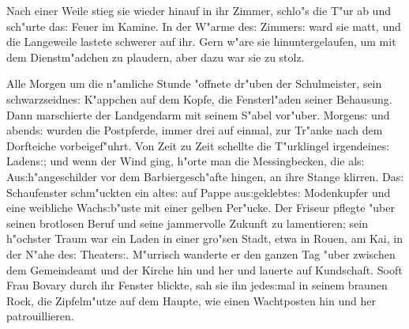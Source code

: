 \documentclass[oneside,12pt]{book}
\newcommand{\s}{s:}%
\begin{document}
Nach einer Weile stieg sie wieder hinauf in ihr Zimmer, schlo"s
die T"ur ab und sch"urte da{\s} Feuer im Kamine. In der W"arme
de{\s} Zimmer{\s} ward sie matt, und die Langeweile lastete
schwerer auf ihr. Gern w"are sie hinuntergelaufen, um mit dem
Dienstm"adchen zu plaudern, aber dazu war sie zu stolz.

Alle Morgen um die n"amliche Stunde "offnete dr"uben der
Schulmeister, sein schwarzseidne{\s} K"appchen auf dem Kopfe, die
Fensterl"aden seiner Behausung. Dann marschierte der Landgendarm
mit seinem S"abel vor"uber. Morgen{\s} und abend{\s} wurden die
Postpferde, immer drei auf einmal, zur Tr"anke nach dem Dorfteiche
vorbeigef"uhrt. Von Zeit zu Zeit schellte die T"urklingel
irgendeine{\s} Laden{\s}; und wenn der Wind ging, h"orte man die
Messingbecken, die al{\s} Au{\s}h"angeschilder vor dem
Barbiergesch"afte hingen, an ihre Stange klirren. Da{\s}
Schaufenster schm"uckten ein alte{\s} auf Pappe au{\s}geklebte{\s}
Modenkupfer und eine weibliche Wach{\s}b"uste mit einer gelben
Per"ucke. Der Friseur pflegte "uber seinen brotlosen Beruf und
seine jammervolle Zukunft zu lamentieren; sein h"ochster Traum war
ein Laden in einer gro"sen Stadt, etwa in Rouen, am Kai, in der
N"ahe de{\s} Theater{\s}. M"urrisch wanderte er den ganzen Tag
"uber zwischen dem Gemeindeamt und der Kirche hin und her und
lauerte auf Kundschaft. Sooft Frau Bovary durch ihr Fenster
blickte, sah sie ihn jede{\s}mal in seinem braunen Rock, die
Zipfelm"utze auf dem Haupte, wie einen Wachtposten hin und her
patrouillieren.
\end{document}
